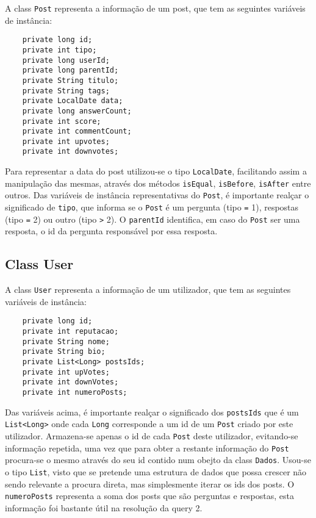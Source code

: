 \documentclass[11pt,a4paper]{article}
\begin{document}
A class \texttt{Post} representa a informação de um post, que tem as seguintes variáveis de instância:

\begin{verbatim}
    private long id;
    private int tipo;
    private long userId;
    private long parentId;
    private String titulo;
    private String tags;
    private LocalDate data;
    private long answerCount;
    private int score;
    private int commentCount;
    private int upvotes;
    private int downvotes;
\end{verbatim}

Para representar a data do post utilizou-se o tipo \texttt{LocalDate}, facilitando assim a manipulação das mesmas,
através dos métodos \texttt{isEqual}, \texttt{isBefore}, \texttt{isAfter} entre outros.
Das variáveis de instância representativas do \texttt{Post}, é importante realçar o significado de \texttt{tipo},
que informa se o \texttt{Post} é um pergunta (tipo \texttt{=} 1), respostas (tipo \texttt{=} 2) ou outro (tipo \texttt{>} 2).
O \texttt{parentId} identifica, em caso do \texttt{Post} ser uma resposta, o id da pergunta responsável por essa resposta.\newline

\subsection{Class User}
A class \texttt{User} representa a informação de um utilizador, que tem as seguintes variáveis de instância:

\begin{verbatim}
    private long id;
    private int reputacao;
    private String nome;
    private String bio;
    private List<Long> postsIds;
    private int upVotes;
    private int downVotes;
    private int numeroPosts;
\end{verbatim}

Das variáveis acima, é importante realçar o significado dos \texttt{postsIds} que é um \texttt{List<Long>}
onde cada \texttt{Long} corresponde a um id de um \texttt{Post} criado por este utilizador.
Armazena-se apenas o id de cada \texttt{Post} deste utilizador, evitando-se informação repetida, uma vez que para obter a restante
informação do \texttt{Post} procura-se o mesmo através do seu id contido num obejto da class \texttt{Dados}.
Usou-se o tipo \texttt{List}, visto que se pretende uma estrutura de dados que possa crescer não sendo relevante a procura direta,
mas simplesmente iterar os ids dos posts.
O \texttt{numeroPosts} representa a soma dos posts que são perguntas e respostas, esta informação foi bastante útil na resolução da query 2.\newline
\end{document}
